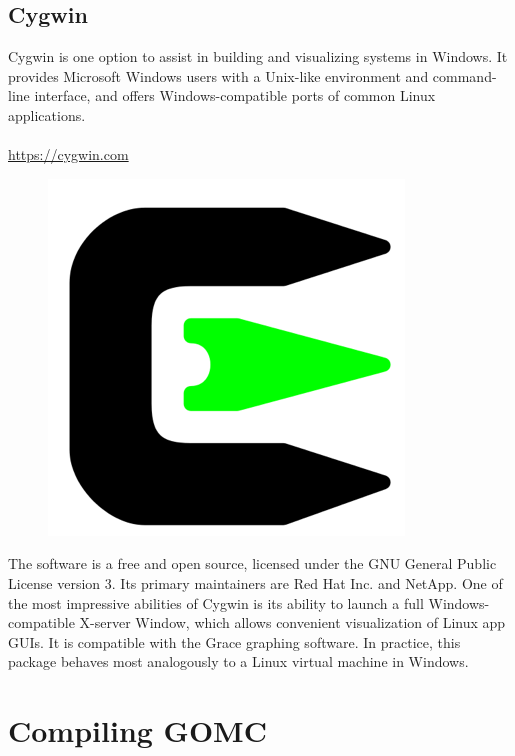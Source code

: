 \subsection{Cygwin}
Cygwin is one option to assist in building and visualizing systems in Windows. It provides Microsoft Windows users with a Unix-like environment and command-line interface, and offers Windows-compatible ports of common Linux applications.\\\\
\url{https://cygwin.com}
\begin{figure}[H]
\centering
\includegraphics[scale=0.6]{images/cygwin}
\end{figure}
The software is a free and open source, licensed under the GNU General Public License version 3. Its primary maintainers are Red Hat Inc. and NetApp. One of the most impressive abilities of Cygwin is its ability to launch a full Windows-compatible X-server Window, which allows convenient visualization of Linux app GUIs. It is compatible with the Grace graphing software. In practice, this package behaves most analogously to a Linux virtual machine in Windows.

\section{Compiling GOMC}
